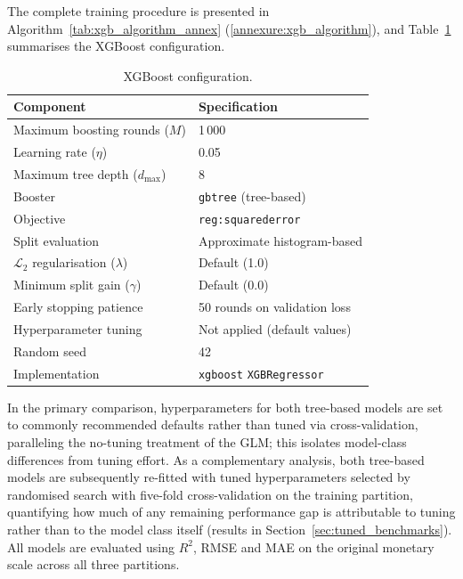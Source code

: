 The complete training procedure is presented in
Algorithm~\ref{tab:xgb_algorithm_annex}
(\ref{annexure:xgb_algorithm}), and
Table~\ref{tab:xgb_hyperparameters_ch3} summarises the XGBoost
configuration.

\begin{table}[H]
\centering
\small
\renewcommand{\arraystretch}{1.15}
\begin{tabular}{p{}p{}}
\toprule
\textbf{Component} & \textbf{Specification} \\
\midrule
Maximum boosting rounds ($M$) & 1\,000 \\
Learning rate ($\eta$) & 0.05 \\
Maximum tree depth ($d_{\max}$) & 8 \\
Booster & \texttt{gbtree} (tree-based) \\
Objective & \texttt{reg:squarederror} \\
Split evaluation & Approximate histogram-based \\
$\mathcal{L}_2$ regularisation ($\lambda$) & Default (1.0) \\
Minimum split gain ($\gamma$) & Default (0.0) \\
Early stopping patience & 50 rounds on validation loss \\
Hyperparameter tuning & Not applied (default values) \\
Random seed & 42 \\
Implementation & \texttt{xgboost} \texttt{XGBRegressor} \\
\bottomrule
\end{tabular}
\caption{XGBoost configuration.}
\label{tab:xgb_hyperparameters_ch3}
\end{table}

In the primary comparison, hyperparameters for both tree-based models are
set to commonly recommended defaults rather than tuned via
cross-validation, paralleling the no-tuning treatment of the GLM;
this isolates model-class differences from tuning effort.  As a
complementary analysis, both tree-based models are subsequently re-fitted
with tuned hyperparameters selected by randomised search with five-fold
cross-validation on the training partition, quantifying how much of any
remaining performance gap is attributable to tuning rather than to the
model class itself (results in Section~\ref{sec:tuned_benchmarks}).  All
models are evaluated using $R^2$, RMSE and MAE on the
original monetary scale across all three partitions.


